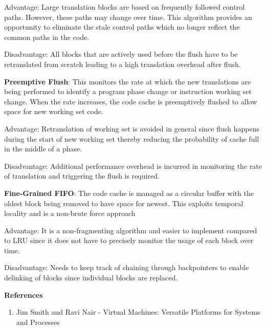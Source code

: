 \documentclass[11pt,a4paper,oneside]{article}
\begin{document}
\begin{enumerate}
		Advantage: Large translation blocks are based on frequently followed control paths. However, these paths may change over time. This algorithm provides an opportunity to eliminate the stale control paths which no longer reflect the common paths in the code.
		
		Disadvantage: All blocks that are actively used before the flush have to be retranslated from scratch leading to a high translation overhead after flush.
		
		\textbf{Preemptive Flush}: This monitors the rate at which the new translations are being performed to identify a program phase change or instruction working set change. When the rate increases, the code cache is preemptively flushed to allow space for new working set code. 
		
		Advantage: Retranslation of working set is avoided in general since flush happens during the start of new working set thereby reducing the probability of cache full in the middle of a phase. 
		
		Disadvantage: Additional performance overhead is incurred in monitoring the rate of translation and triggering the flush is required. 
		
		\textbf{Fine-Grained FIFO}: The code cache is managed as a circular buffer with the oldest block being removed to have space for newest. This exploits temporal locality and is a non-brute force approach
		
		Advantage: It is a non-fragmenting algorithm and easier to implement compared to LRU since it does not have to precisely monitor the usage of each block over time.
		
		Disadvantage: Needs to keep track of chaining through backpointers to enable delinking of blocks since individual blocks are replaced. 
		
 		
     	
		
	        			
	\end{enumerate}
    
    \textbf{References}
    \begin{enumerate}
    	\item Jim Smith and Ravi Nair - Virtual Machines: Versatile Platforms for Systems and Processes  	
    \end{enumerate}
 

    
\end{document}
